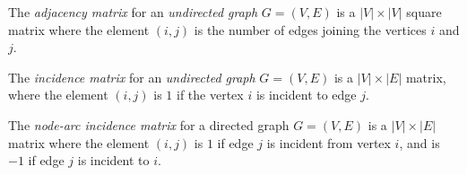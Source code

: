 \begin{definition}
The \emph{adjacency matrix} for an \emph{undirected graph} $G=(V,E)$ is a $|V|\times|V|$ square matrix where the element $(i,j)$ is the number of edges joining the vertices $i$ and $j$.
\end{definition}
\begin{definition}
The \emph{incidence matrix} for an \emph{undirected graph} $G=(V,E)$ is a $|V|\times|E|$ matrix,
where the element $(i,j)$ is $1$ if the vertex $i$ is incident to edge $j$.
\end{definition}

\begin{definition}
The \emph{node-arc incidence matrix} for a directed graph $G=(V,E)$ is a $|V|\times|E|$ matrix where the element $(i,j)$ is $1$ if edge $j$ is incident from vertex $i$,
and is $-1$ if edge $j$ is incident to $i$.
\end{definition}




















